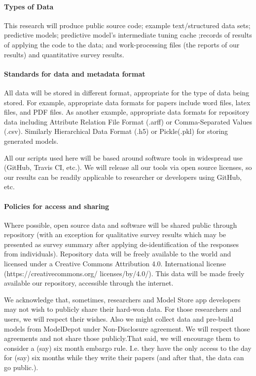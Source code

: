 \paragraph{Types of Data}
This research will produce public source code; example text/structured data sets; predictive models; predictive model's intermediate tuning cache ;records of results of applying the code to the data; and work-processing files (the reports of our results) and quantitative survey results.
\vspace{8pt}

\paragraph{Standards for data and metadata format}
All data will be stored in different format, appropriate for the type of data being stored. For example, appropriate data formats for papers include word files, latex files, and PDF files. As another example, appropriate data formats for repository data including Attribute Relation File Format (.arff) or Comma-Separated Values (.csv). Similarly Hierarchical Data Format (.h5) or Pickle(.pkl) for storing generated models. 
\vspace{8pt}

\noindent
All our scripts used here will be based around software tools in widespread use (GitHub, Travis CI, etc.). We will release all our tools via open source licenses, so our results can be readily applicable to researcher or developers using GitHub, etc. 
\vspace{8pt}

\paragraph{Policies for access and sharing}
Where possible, open source data and software will be shared public through repository (with an exception for qualitative survey results which may be presented as survey summary after applying de-identification of the responses from individuals). Repository data will be freely available to the world and licensed under a Creative Commons Attribution 4.0. International license (https://creativecommons.org/ licenses/by/4.0/). This data will be made freely available our repository, accessible through the internet. 
\vspace{8pt}

\noindent
We acknowledge that, sometimes, researchers  and Model
Store app developers
may not wish to publicly share their hard-won data. For those researchers and users, we will respect their wishes. Also we might  collect data and pre-build models from ModelDepot under Non-Disclosure agreement. We will respect those agreements and not share those publicly.That said, we will encourage them to consider a (say) six month embargo rule. I.e. they have the only access to the day for (say) six months while they write their papers (and after that, the data can go public.). 
\vspace{8pt}



